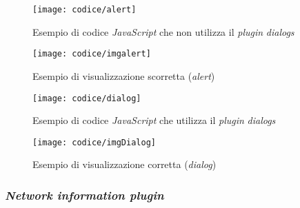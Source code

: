 \begin{figure}[!h] 
    \centering 
    \texttt{[image: codice/alert]} 
    \caption{Esempio di codice \textit{JavaScript} che non utilizza il \textit{plugin} \textit{dialogs}}
\end{figure}

\newpage

\begin{figure}[!h] 
    \centering 
    \texttt{[image: codice/imgalert]} 
    \caption{Esempio di visualizzazione scorretta (\textit{alert})}
\end{figure}

\begin{figure}[!h] 
    \centering 
    \texttt{[image: codice/dialog]} 
    \caption{Esempio di codice \textit{JavaScript} che utilizza il \textit{plugin} \textit{dialogs}}
\end{figure}

\begin{figure}[!h] 
    \centering 
    \texttt{[image: codice/imgDialog]} 
    \caption{Esempio di visualizzazione corretta (\textit{dialog})}
\end{figure}

\subsubsection{\textit{Network information plugin}}


